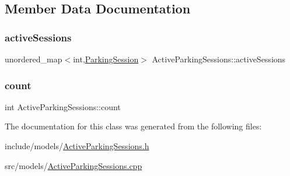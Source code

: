 \subsection{Member Data Documentation}
\mbox{\label{class_active_parking_sessions_ac85c55c90db020157588dcc520cbfa22}} 
\subsubsection{\texorpdfstring{active\+Sessions}{activeSessions}}
{\footnotesize\ttfamily unordered\+\_\+map$<$int,\mbox{\hyperlink{class_parking_session}{Parking\+Session}}$>$ Active\+Parking\+Sessions\+::active\+Sessions\hspace{0.3cm}{\ttfamily [private]}}

\mbox{\label{class_active_parking_sessions_a8097a4407c5f9e02444740df84602840}} 
\subsubsection{\texorpdfstring{count}{count}}
{\footnotesize\ttfamily int Active\+Parking\+Sessions\+::count\hspace{0.3cm}{\ttfamily [private]}}



The documentation for this class was generated from the following files\+:\begin{DoxyCompactItemize}
\item 
include/models/\mbox{\hyperlink{_active_parking_sessions_8h}{Active\+Parking\+Sessions.\+h}}\item 
src/models/\mbox{\hyperlink{_active_parking_sessions_8cpp}{Active\+Parking\+Sessions.\+cpp}}\end{DoxyCompactItemize}
